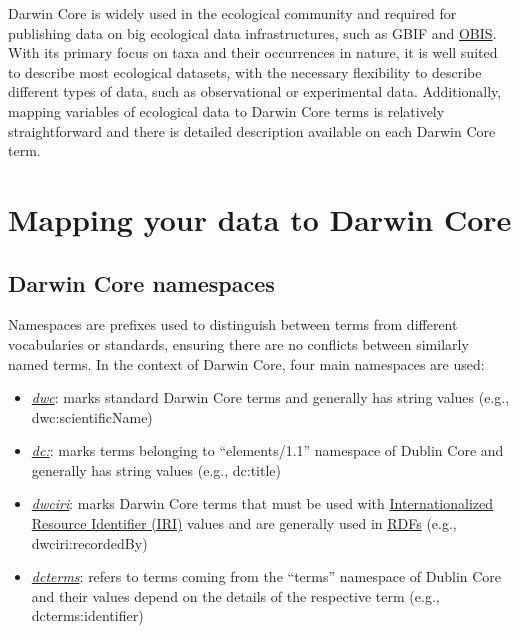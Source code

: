 \documentclass[
]{book}
\begin{document}
Darwin Core is widely used in the ecological community and required for publishing data on big ecological data infrastructures, such as GBIF and \protect\hyperlink{OBIS}{OBIS}. With its primary focus on taxa and their occurrences in nature, it is well suited to describe most ecological datasets, with the necessary flexibility to describe different types of data, such as observational or experimental data. Additionally, mapping variables of ecological data to Darwin Core terms is relatively straightforward and there is detailed description available on each Darwin Core term.

\hypertarget{mapping-your-data-to-darwin-core}{%
\section{Mapping your data to Darwin Core}\label{mapping-your-data-to-darwin-core}}

\hypertarget{darwin-core-namespaces}{%
\subsection{Darwin Core namespaces}\label{darwin-core-namespaces}}

Namespaces are prefixes used to distinguish between terms from different vocabularies or standards, ensuring there are no conflicts between similarly named terms. In the context of Darwin Core, four main namespaces are used:

\begin{itemize}
\item
  \href{http://rs.tdwg.org/dwc/terms/}{\emph{dwc}}: marks standard Darwin Core terms and generally has string values (e.g., dwc:scientificName)
\item
  \href{http://purl.org/dc/elements/1.1/}{\emph{dc:}}: marks terms belonging to ``elements/1.1'' namespace of Dublin Core and generally has string values (e.g., dc:title)
\item
  \href{http://rs.tdwg.org/dwc/iri/}{\emph{dwciri}}: marks Darwin Core terms that must be used with \protect\hyperlink{URI}{Internationalized Resource Identifier (IRI)} values and are generally used in \protect\hyperlink{RDF}{RDFs} (e.g., dwciri:recordedBy)
\item
  \href{http://purl.org/dc/terms/}{\emph{dcterms}}: refers to terms coming from the ``terms'' namespace of Dublin Core and their values depend on the details of the respective term (e.g., dcterms:identifier)
\end{itemize}
\end{document}
